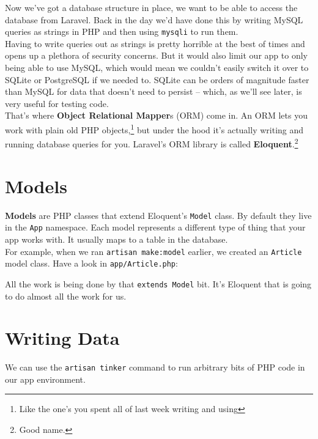 Now we've got a database structure in place, we want to be able to access the database from Laravel. Back in the day we'd have done this by writing MySQL queries as strings in PHP and then using \texttt{mysqli} to run them.
\\

Having to write queries out as strings is pretty horrible at the best of times and opens up a plethora of security concerns. But it would also limit our app to only being able to use MySQL, which would mean we couldn't easily switch it over to SQLite or PostgreSQL if we needed to. SQLite can be orders of magnitude faster than MySQL for data that doesn't need to persist – which, as we'll see later, is very useful for testing code.
\\

That's where \textbf{Object Relational Mapper}s (ORM) come in. An ORM lets you work with plain old PHP objects,\footnote{Like the one's you spent all of last week writing and using} but under the hood it's actually writing and running database queries for you. Laravel's ORM library is called \textbf{Eloquent}.\footnote{Good name.}

\section{Models}

\textbf{Models} are PHP classes that extend Eloquent's \texttt{Model} class. By default they live in the \texttt{App} namespace. Each model represents a different type of thing that your app works with. It usually maps to a table in the database.
\\

For example, when we ran \texttt{artisan make:model} earlier, we created an \texttt{Article} model class. Have a look in \texttt{app/Article.php}:


All the work is being done by that \texttt{extends Model} bit. It's Eloquent that is going to do almost all the work for us.



\section{Writing Data}

We can use the \texttt{artisan tinker} command to run arbitrary bits of PHP code in our app environment.
\\

